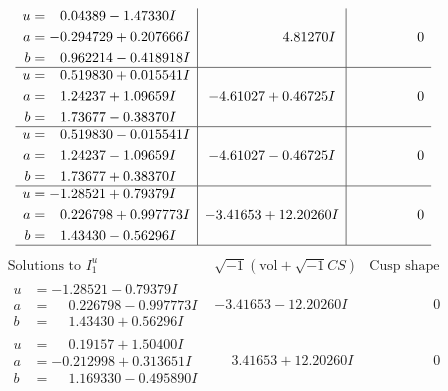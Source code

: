 \documentclass[1p]{elsarticle_modified}
\theoremstyle{definition}
\newcommand{\I}{\sqrt{-1}}
\begin{document}
$$\begin{array}{c|c|c}
\begin{aligned}
u &= \phantom{-}0.04389 - 1.47330 I \\
a &= -0.294729 + 0.207666 I \\
b &= \phantom{-}0.962214 - 0.418918 I\end{aligned}
 & \phantom{-0.000000 -}4.81270 I & \phantom{-0.000000 } 0 \\ \hline\begin{aligned}
u &= \phantom{-}0.519830 + 0.015541 I \\
a &= \phantom{-}1.24237 + 1.09659 I \\
b &= \phantom{-}1.73677 - 0.38370 I\end{aligned}
 & -4.61027 + 0.46725 I & \phantom{-0.000000 } 0 \\ \hline\begin{aligned}
u &= \phantom{-}0.519830 - 0.015541 I \\
a &= \phantom{-}1.24237 - 1.09659 I \\
b &= \phantom{-}1.73677 + 0.38370 I\end{aligned}
 & -4.61027 - 0.46725 I & \phantom{-0.000000 } 0 \\ \hline\begin{aligned}
u &= -1.28521 + 0.79379 I \\
a &= \phantom{-}0.226798 + 0.997773 I \\
b &= \phantom{-}1.43430 - 0.56296 I\end{aligned}
 & -3.41653 + 12.20260 I & \phantom{-0.000000 } 0\\
 \hline 
 \end{array}$$\newpage$$\begin{array}{c|c|c}  
\text{Solutions to }I^u_{1}& \I (\text{vol} + \sqrt{-1}CS) & \text{Cusp shape}\\
 \hline 
\begin{aligned}
u &= -1.28521 - 0.79379 I \\
a &= \phantom{-}0.226798 - 0.997773 I \\
b &= \phantom{-}1.43430 + 0.56296 I\end{aligned}
 & -3.41653 - 12.20260 I & \phantom{-0.000000 } 0 \\ \hline\begin{aligned}
u &= \phantom{-}0.19157 + 1.50400 I \\
a &= -0.212998 + 0.313651 I \\
b &= \phantom{-}1.169330 - 0.495890 I\end{aligned}
 & \phantom{-}3.41653 + 12.20260 I & \phantom{-0.000000 } 0 \\ \hline\begin{aligned}

\end{aligned}
\end{array}$$
\end{document}
